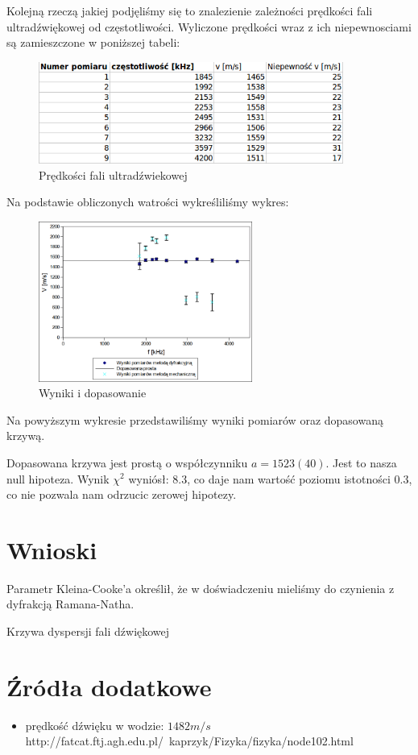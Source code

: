 \documentclass[a4paper,12pt]{article}
\begin{document}
Kolejną rzeczą jakiej podjęliśmy się to znalezienie zależności prędkości fali ultradźwiękowej od częstotliwości. Wyliczone prędkości wraz z ich niepewnosciami są zamieszczone w poniższej tabeli: 

\begin{figure} [H]
  \begin{center}
    \includegraphics[width = 10cm]{tab7.png}
    \caption{Prędkości fali ultradźwiekowej}
  \end{center}
\end{figure}

Na podstawie obliczonych watrości wykreśliliśmy wykres: 

\begin{figure} [H]
  \begin{center}
    \includegraphics[width = 7cm]{wykres5.png}
    \caption{Wyniki i dopasowanie}
  \end{center}
\end{figure}

Na powyższym wykresie przedstawiliśmy wyniki pomiarów oraz dopasowaną krzywą.

Dopasowana krzywa jest prostą o współczynniku $a=1523(40)$. Jest to nasza null hipoteza.
Wynik $\chi^2$ wyniósł: 8.3, co daje nam wartość poziomu istotności 0.3, co nie pozwala nam odrzucic zerowej hipotezy.

\section{Wnioski}


Parametr Kleina-Cooke'a określił, że w doświadczeniu mieliśmy do czynienia z dyfrakcją Ramana-Natha. 

Krzywa dyspersji fali dźwiękowej 

\section {Źródła dodatkowe}
  
 \begin{itemize}
   \item prędkość dźwięku w wodzie: $ 1482 m/s$ \\ http://fatcat.ftj.agh.edu.pl/~kaprzyk/Fizyka/fizyka/node102.html
   
 \end{itemize}
\end{document}

